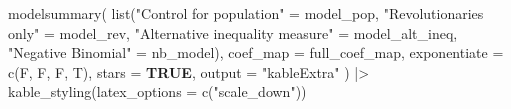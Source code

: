 \documentclass[
  11pt,
  letterpaper,
  DIV=11,
  numbers=noendperiod]{scrartcl}
\newenvironment{Shaded}{\begin{snugshade}}{\end{snugshade}}
\newcommand{\AttributeTok}[1]{\textcolor[rgb]{0.16,0.50,0.73}{#1}}
\newcommand{\ConstantTok}[1]{\textcolor[rgb]{0.15,0.68,0.68}{\textbf{#1}}}
\newcommand{\FunctionTok}[1]{\textcolor[rgb]{0.56,0.27,0.68}{#1}}
\newcommand{\NormalTok}[1]{\textcolor[rgb]{0.81,0.81,0.76}{#1}}
\newcommand{\OtherTok}[1]{\textcolor[rgb]{0.15,0.68,0.38}{#1}}
\newcommand{\SpecialCharTok}[1]{\textcolor[rgb]{0.24,0.68,0.91}{#1}}
\newcommand{\StringTok}[1]{\textcolor[rgb]{0.96,0.31,0.31}{#1}}
\begin{document}
\begin{Shaded}
\begin{Highlighting}[]
\FunctionTok{modelsummary}\NormalTok{(}
  \FunctionTok{list}\NormalTok{(}\StringTok{"Control for population"} \OtherTok{=}\NormalTok{ model\_pop,}
       \StringTok{"Revolutionaries only"} \OtherTok{=}\NormalTok{ model\_rev,}
       \StringTok{"Alternative inequality measure"} \OtherTok{=}\NormalTok{ model\_alt\_ineq,}
       \StringTok{"Negative Binomial"} \OtherTok{=}\NormalTok{ nb\_model),}
  \AttributeTok{coef\_map =}\NormalTok{ full\_coef\_map,}
  \AttributeTok{exponentiate =} \FunctionTok{c}\NormalTok{(F, F, F, T),}
  \AttributeTok{stars =} \ConstantTok{TRUE}\NormalTok{,}
  \AttributeTok{output =} \StringTok{"kableExtra"}
\NormalTok{) }\SpecialCharTok{|\textgreater{}} 
  \FunctionTok{kable\_styling}\NormalTok{(}\AttributeTok{latex\_options =} \FunctionTok{c}\NormalTok{(}\StringTok{"scale\_down"}\NormalTok{))}
\end{Highlighting}
\end{Shaded}
\end{document}
